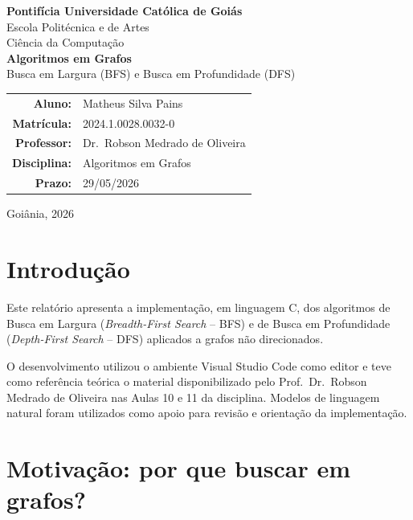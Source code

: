 \documentclass[12pt,a4paper]{article}
\begin{document}
\begin{titlepage}
\centering
{\large \textbf{Pontifícia Universidade Católica de Goiás}}\\[0.3cm]
{\large Escola Politécnica e de Artes}\\[0.3cm]
{\large Ciência da Computação}\\[2.5cm]

{\Large \textbf{Algoritmos em Grafos}}\\[0.5cm]
{\large Busca em Largura (BFS) e Busca em Profundidade (DFS)}\\[2.5cm]

\begin{tabular}{rl}
\textbf{Aluno:}      & Matheus Silva Pains \\[4pt]
\textbf{Matrícula:}  & 2024.1.0028.0032-0  \\[4pt]
\textbf{Professor:}  & Dr.\ Robson Medrado de Oliveira \\[4pt]
\textbf{Disciplina:} & Algoritmos em Grafos \\[4pt]
\textbf{Prazo:}      & 29/05/2026
\end{tabular}

\vfill
{\large Goiânia, 2026}
\end{titlepage}

\tableofcontents
\newpage

\section{Introdução}

Este relatório apresenta a implementação, em linguagem C, dos algoritmos de
Busca em Largura (\textit{Breadth-First Search} -- BFS) e de Busca em
Profundidade (\textit{Depth-First Search} -- DFS) aplicados a grafos não
direcionados.

O desenvolvimento utilizou o ambiente Visual Studio Code como editor e teve
como referência teórica o material disponibilizado pelo Prof.\ Dr.\ Robson
Medrado de Oliveira nas Aulas 10 e 11 da disciplina. Modelos de linguagem
natural foram utilizados como apoio para revisão e orientação da implementação.

\section{Motivação: por que buscar em grafos?}
\end{document}
